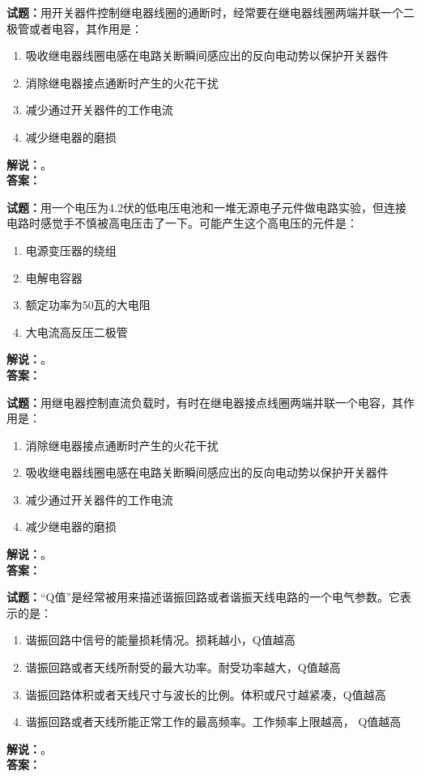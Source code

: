 \documentclass{ctexbook}
\begin{document}
\bigskip

\noindent\textbf{试题：}用开关器件控制继电器线圈的通断时，经常要在继电器线圈两端并联一个二极管或者电容，其作用是：
\begin{enumerate}[leftmargin=3em]
  \item 吸收继电器线圈电感在电路关断瞬间感应出的反向电动势以保护开关器件
  \item 消除继电器接点通断时产生的火花干扰
  \item 减少通过开关器件的工作电流
  \item 减少继电器的磨损
\end{enumerate}
\noindent\textbf{解说：}\textbf{}。\\\noindent\textbf{答案：}

\bigskip

\noindent\textbf{试题：}用一个电压为4.2伏的低电压电池和一堆无源电子元件做电路实验，但连接电路时感觉手不慎被高电压击了一下。可能产生这个高电压的元件是：
\begin{enumerate}[leftmargin=3em]
  \item 电源变压器的绕组
  \item 电解电容器
  \item 额定功率为50瓦的大电阻
  \item 大电流高反压二极管
\end{enumerate}
\noindent\textbf{解说：}\textbf{}。\\\noindent\textbf{答案：}

\bigskip

\noindent\textbf{试题：}用继电器控制直流负载时，有时在继电器接点线圈两端并联一个电容，其作用是：
\begin{enumerate}[leftmargin=3em]
  \item 消除继电器接点通断时产生的火花干扰
  \item 吸收继电器线圈电感在电路关断瞬间感应出的反向电动势以保护开关器件
  \item 减少通过开关器件的工作电流
  \item 减少继电器的磨损
\end{enumerate}
\noindent\textbf{解说：}\textbf{}。\\\noindent\textbf{答案：}

\bigskip

\noindent\textbf{试题：}“Q值”是经常被用来描述谐振回路或者谐振天线电路的一个电气参数。它表示的是：
\begin{enumerate}[leftmargin=3em]
  \item 谐振回路中信号的能量损耗情况。损耗越小，Q值越高
  \item 谐振回路或者天线所耐受的最大功率。耐受功率越大，Q值越高
  \item 谐振回路体积或者天线尺寸与波长的比例。体积或尺寸越紧凑，Q值越高
  \item 谐振回路或者天线所能正常工作的最高频率。工作频率上限越高， Q值越高
\end{enumerate}
\noindent\textbf{解说：}\textbf{}。\\\noindent\textbf{答案：}
\end{document}
